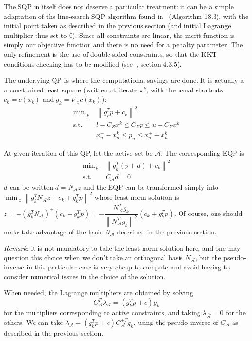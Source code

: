 \documentclass[]{article}
\DeclareMathOperator*{\minimize}{\min.}
\newcommand{\st}{\mbox{s.t.}}
\begin{document}
The SQP in itself does not deserve a particular treatment: it can be a simple adaptation of the line-search SQP algorithm found in~\cite{nocedal:book:2006} (Algorithm 18.3), with the initial point taken as described in the previous section (and initial Lagrange multiplier thus set to $0$). Since all constraints are linear, the merit function is simply our objective function and there is no need for a penalty parameter. The only refinement is the use of double sided constraints, so that the KKT conditions checking has to be modified (see~\cite{brossette:phd:2016}, section 4.3.5).

The underlying QP is where the computational savings are done. It is actually a a constrained least square (written at iterate $x^k$, with the usual shortcuts $c_k = c(x_k)$ and $g_k = \nabla_{x}c(x_k)$):
\begin{align}
  \minimize_p \ & \left\|g_k^T p + c_k\right\|^2 \\
  \st \ & l-C_Z x^k \leq C_Z p \leq u-C_Z x^k \\
        & x_n^- - x^k_n \leq p_n \leq x_n^+ - x^k_n
\end{align}

At given iteration of this QP, let the active set be $\mathcal{A}$. The corresponding EQP is
\begin{align}
  \minimize_p \ & \left\|g_k^T (p+d) + c_k\right\|^2 \\
  \st \ & C_{\mathcal{A}} d = 0
\end{align}
$d$ can be written $d = N_{\mathcal{A}} z$ and the EQP can be transformed simply into $\minimize_z \left\|g_k^T N_{\mathcal{A}}z + c_k + g_k^T p\right\|^2$ whose least norm solution is $z = - (g_k^T N_{\mathcal{A}})^+ (c_k + g_k^T p) = - \dfrac{N_{\mathcal{A}}^T g_k}{\left\|N_{\mathcal{A}}^T g_k\right\|^2}(c_k + g_k^T p)$. Of course, one should make take advantage of the basis $N_{\mathcal{A}}$ described in the previous section.

\emph{Remark}: it is not mandatory to take the least-norm solution here, and one may question this choice when we don't take an orthogonal basis $N_{\mathcal{A}}$, but the pseudo-inverse in this particular case is very cheap to compute and avoid having to consider numerical issues in the choice of the solution.

When needed, the Lagrange multipliers are obtained by solving
\begin{equation}
  C_{\mathcal{A}}^T \lambda_{\mathcal{A}} = (g_k^T p +c) g_k
\end{equation}
for the multipliers corresponding to active constraints, and taking $\lambda_{\bar{\mathcal{A}}} = 0$ for the others. We can take $\lambda_{\mathcal{A}} = (g_k^T p+c) C_{\mathcal{A}}^{+T}g_k$, using the pseudo inverse of $C_{\mathcal{A}}$ as described in the previous section.
\end{document}
